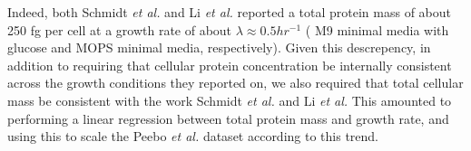 \documentclass[11pt]{article}
\begin{document}
Indeed, both Schmidt {\it et al.} and Li {\it et al.} reported a total protein mass of about
250 fg per cell at a growth rate of about $\lambda \approx 0.5 hr^{-1}$ ( M9
minimal media with glucose and MOPS minimal media, respectively). Given this
descrepency, in addition to requiring that cellular protein concentration be
internally consistent across the growth conditions they reported on, we also
required that total cellular mass be consistent with the work Schmidt {\it et al.} and
Li {\it et al.} This amounted to performing a linear regression between total protein
mass and growth rate, and using this to scale the Peebo {\it et al.} dataset according
to this trend.



%
\end{document}
